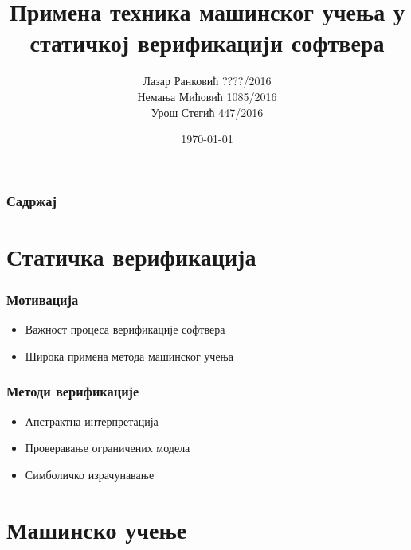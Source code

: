 \documentclass{beamer}
\title[Семинарски МСНР]{Примена техника машинског учења у статичкој верификацији софтвера}
\author{	Лазар Ранковић ????/2016 \\
		Немања Мићовић 1085/2016 \\
		Урош Стегић 447/2016
}
\institute[МАТФ]{Математички факултет}
\date{\today}
\begin{document}
\begin{frame}
\titlepage
\end{frame}

\begin{frame}
\frametitle{Садржај}
\tableofcontents
\end{frame}


\section{Статичка верификација}

\begin{frame}
\frametitle{Мотивација}
\begin{itemize}
    \item Важност процеса верификације софтвера
    \item Широка примена метода машинског учења
\end{itemize}
\end{frame}
\begin{frame}
\frametitle{Методи верификације}
\begin{itemize}
	\item Апстрактна интерпретација
 	\item Проверавање ограничених модела
 	\item Симболичко израчунавање
\end{itemize}
\end{frame}



\section{Машинско учење}
\end{document}
